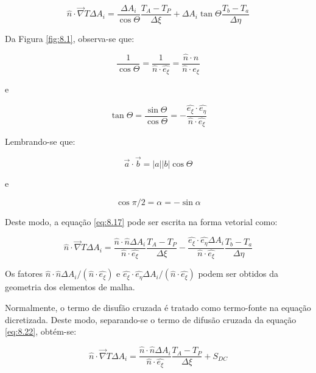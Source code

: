 \begin{equation}
    \label{eq:8.17}
    \hat{n} \cdot \vec{\nabla}T \Delta A_i = \frac{\Delta A_i}{\cos{\Theta}} \frac{T_A - T_P}{\Delta \xi} + \Delta A_i \tan{\Theta} \frac{T_b - T_a}{\Delta \eta}
\end{equation}

Da Figura \ref{fig:8.1}, observa-se que:

\begin{equation}
    \label{eq:8.18}
    \frac{1}{\cos \Theta} = \frac{1}{\hat{n}\cdot \hat{e_\xi}} = \frac{\hat{n} \cdot \hat{n}}{\hat{n} \cdot \hat{e_\xi}}
\end{equation}

e

\begin{equation}
    \label{eq:8.19}
    \tan{\Theta} = \frac{\sin{\Theta}}{\cos{\Theta}} = - \frac{\hat{e_\xi} \cdot \hat{e_\eta}}{\hat{n} \cdot \hat{e_\xi}}
\end{equation}

Lembrando-se que:

\begin{equation}
    \label{eq:8.20}
    \vec{a} \cdot \vec{b} = |a| |b| \cos{\Theta}
\end{equation}

e

\begin{equation}
    \label{eq:8.21}
    \cos{\pi / 2 = \alpha} = - \sin{\alpha}
\end{equation}

Deste modo, a equação \ref{eq:8.17} pode ser escrita na forma vetorial como:

\begin{equation}
    \label{eq:8.22}
    \hat{n} \cdot \vec{\nabla} T \Delta A_i = \frac{\hat{n} \cdot \hat{n} \Delta A_i}{\hat{n} \cdot \hat{e_\xi}} \frac{T_A - T_P}{\Delta \xi} - \frac{\hat{e_\xi} \cdot \hat{e_\eta} \Delta A_i}{\hat{n} \cdot \hat{e_\xi}} \frac{T_b - T_a}{\Delta \eta}
\end{equation}

Os fatores $\hat{n} \cdot \hat{n} \Delta A_i / (\hat{n} \cdot \hat{e_\xi})$ e $\hat{e_\xi} \cdot \hat{e_\eta} \Delta A_i / (\hat{n} \cdot \hat{e_\xi})$ podem ser obtidos da geometria dos elementos de malha.

Normalmente, o termo de disufão cruzada é tratado como termo-fonte na equação dicretizada. Deste modo, separando-se o termo de difusão cruzada da equação \ref{eq:8.22}, obtém-se:

\begin{equation}
    \label{eq:8.23}
    \hat{n} \cdot \vec{\nabla}T \Delta A_i = \frac{\hat{n} \cdot \hat{n} \Delta A_i}{\hat{n} \cdot \hat{e_\xi}} \frac{T_A - T_P}{\Delta \xi} + S_{DC}
\end{equation}

